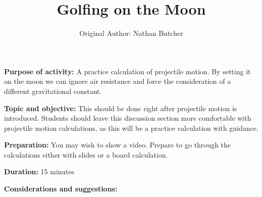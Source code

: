 \documentclass{article}
\title{Golfing on the Moon}
\author{Original Author: Nathan Butcher}
\date{}
\begin{document}
\maketitle
\thispagestyle{empty}

\textbf{Purpose of activity:} A practice calculation of projectile motion. By setting it on the moon we can ignore air resistance and force the consideration of a different gravitational constant.

\textbf{Topic and objective:} This should be done right after projectile motion is introduced. Students should leave this discussion section more comfortable with projectile motion calculations, as this will be a practice calculation with guidance. 

\textbf{Preparation:} You may wish to show a video. Prepare to go through the calculations either with slides or a board calculation.

\textbf{Duration:} 15 minutes

\textbf{Considerations and suggestions:}

\hspace{14pt}
\end{document}
